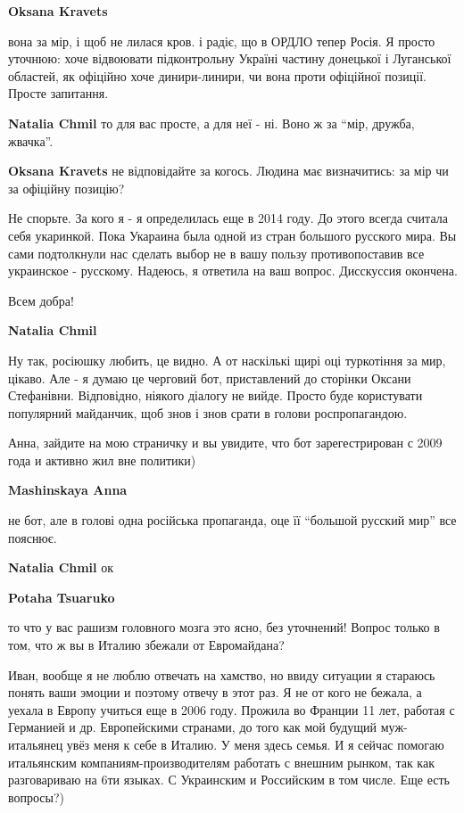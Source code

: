 \begin{itemize}
\begin{itemize}
\begin{itemize}
\textbf{Oksana Kravets} 

вона за мір, і щоб не лилася кров. і радіє, що в ОРДЛО тепер Росія. Я просто
уточнюю: хоче відвоювати підконтрольну Україні частину донецької і Луганської
областей, як офіційно хоче динири-линири, чи вона проти офіційної позиції.
Просте запитання.

\textbf{Natalia Chmil} то для вас просте, а для неї - ні. Воно ж за \enquote{мір, дружба, жвачка}.

\textbf{Oksana Kravets} не відповідайте за когось. Людина має визначитись: за мір чи за офіційну позицію?


Не спорьте. За кого я - я определилась еще в 2014 году. До этого всегда считала
себя укаринкой. Пока Укараина была одной из стран большого русского мира. Вы
сами подтолкнули нас сделать выбор не в вашу пользу противопоставив все
украинское - русскому. Надеюсь, я ответила на ваш вопрос. Дисскуссия окончена.

Всем добра!

\textbf{Natalia Chmil} 

Ну так, росіюшку любить, це видно. А от наскількі щирі оці туркотіння за мир,
цікаво. Але - я думаю це черговий бот, приставлений до сторінки Оксани
Стефанівни. Відповідно, ніякого діалогу не вийде. Просто буде користувати
популярний майданчик, щоб знов і знов срати в голови роспропагандою.


Анна, зайдите на мою страничку и вы увидите, что бот зарегестрирован с 2009
года и активно жил вне политики)

\textbf{Mashinskaya Anna} 

не бот, але в голові одна російська пропаганда, оце її \enquote{большой русский
мир} все пояснює.

\end{itemize} %

\textbf{Natalia Chmil} ок

\textbf{Potaha Tsuaruko} 

то что у вас рашизм головного мозга это ясно, без уточнений! Вопрос только в
том, что ж вы в Италию збежали от Евромайдана?


Иван, вообще я не люблю отвечать на хамство, но ввиду ситуации я стараюсь
понять ваши эмоции и поэтому отвечу в этот раз. Я не от кого не бежала, а
уехала в Европу учиться еще в 2006 году. Прожила во Франции 11 лет, работая с
Германией и др. Европейскими странами, до того как мой будущий муж-итальянец
увёз меня к себе в Италию. У меня здесь семья. И я сейчас помогаю итальянским
компаниям-производителям работать с внешним рынком, так как разговариваю на 6ти
языках. С Украинским и Российским в том числе. Еще есть вопросы?)


\end{itemize}
\end{itemize}
